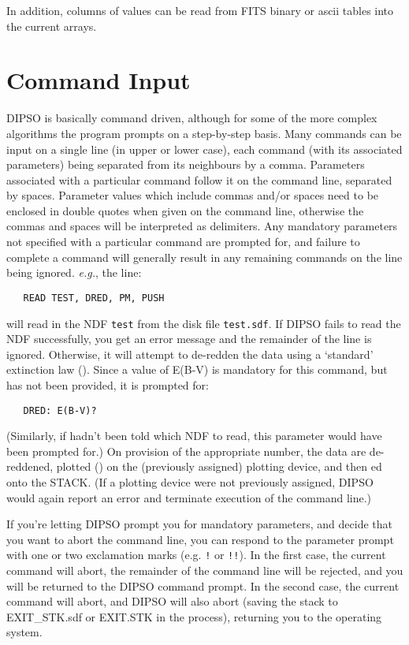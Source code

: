 In addition, columns of values can be read from FITS binary or ascii
tables into the current arrays.

\section {Command Input}

DIPSO is basically command driven, although for some of the more
complex algorithms the program prompts on a step-by-step basis. Many
commands can be input on a single line (in upper or lower case), each
command (with its associated parameters) being separated from its
neighbours by a comma. Parameters associated with a particular command
follow it on the command line, separated by spaces. Parameter values
which include commas and/or spaces need to be enclosed in double quotes
when given on the command line, otherwise the commas and spaces will be
interpreted as delimiters. Any mandatory
parameters not specified with a particular command are prompted for,
and failure to complete a command will generally result in any
remaining commands on the line being ignored. {\em e.g.}, the line:

\begin{verbatim}
   READ TEST, DRED, PM, PUSH
\end{verbatim}

will read in the NDF {\tt{test}}  from the disk file {\tt{test.sdf}}.  If DIPSO
fails to read the NDF successfully, you get an error message and the remainder
of the line is ignored. Otherwise, it will attempt to de-redden the data using a
`standard' extinction law ().  Since a value of E(B-V) is mandatory for
this command, but has not been provided, it is prompted for:

\begin{verbatim}
   DRED: E(B-V)?
\end{verbatim}

(Similarly, if   hadn't been told which NDF to read, this
parameter would have been prompted for.) On provision of the
appropriate number, the data are de-reddened, plotted ()  on the
(previously assigned) plotting device, and then ed onto the STACK.
(If a plotting device were not previously assigned, DIPSO would again
report an error and terminate execution of the command line.)

If you're letting DIPSO prompt you for mandatory parameters, and decide
that you want to abort the command line, you can respond to the parameter
prompt with one or two exclamation marks (e.g. {\tt{!}}  or {\tt{!!}}).  In the
first case, the current command will abort, the remainder of the command
line will be rejected, and you will be returned to the DIPSO command
prompt. In the second case, the current command will abort, and DIPSO
will also abort (saving the stack to EXIT\_STK.sdf or EXIT.STK in the
process), returning you to the operating system.

